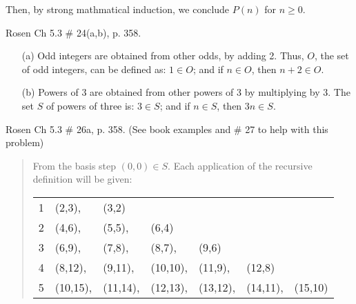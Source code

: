 \begin{questions}
\begin{solution}
  Then, by strong mathmatical induction, we conclude $P(n)$ for $n \geq 0$.
\end{solution}




 Rosen Ch 5.3 \# 24(a,b), p. 358.
    \ifprintanswers
        \vspace{-10pt}
   \fi
\begin{solution}
  \begin{itemize}
    \item[(a)] Odd integers are obtained from other odds, by adding 2. Thus, $O$, the set of odd integers, can be defined as:  $1 \in O$;  and if $n \in O$, then $n+2  \in O$.
    \item[(b)] Powers of 3 are obtained from other powers of 3 by multiplying by 3.  The set $S$ of powers of three is:  $3 \in S$; and if $n \in S$, then $3n \in S$.
  \end{itemize}
\end{solution}



 Rosen Ch 5.3 \# 26a, p. 358. (See book examples and \#
27 to help with this problem)
    \ifprintanswers
        \vspace{-10pt}
   \fi
\begin{solution}
\begin{quote}
    From the basis step $(0,0) \in S$.  Each application of the recursive definition will be given:

    \begin{tabular}{rllllll}
    1 & (2,3), & (3,2) \\
    2 & (4,6), & (5,5), & (6,4) \\
    3 & (6,9), & (7,8), & (8,7), & (9,6) \\
    4 & (8,12), & (9,11), & (10,10), & (11,9), & (12,8) \\
    5 & (10,15), & (11,14), & (12,13), & (13,12), & (14,11), & (15,10) \\
    \end{tabular}
\end{quote}
\end{solution}




\end{questions}
